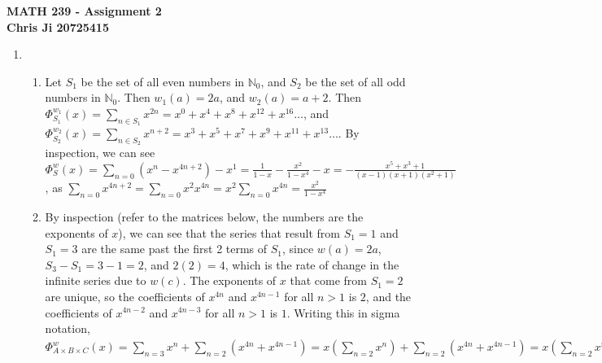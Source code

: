 \documentclass[10pt,english]{article}
\begin{document}
\noindent \begin{center}
\textbf{\large{}MATH 239 - Assignment 2}\\
\textbf{\large{}Chris Ji 20725415}
\par\end{center}{\large \par}
\medskip{}

\begin{enumerate}
\item \begin{enumerate}
    \item Let $S_1$ be the set of all even numbers in $\mathbb{N}_0$, and $S_2$ be the set of all odd numbers in $\mathbb{N}_0$. Then $w_1(a)=2a$, and $w_2(a)=a+2$. Then $\Phi_{S_1}^{w_1}(x)=\sum_{n\in S_1}x^{2n}=x^0+x^4+x^8+x^{12}+x^{16}\ldots$, and $\Phi_{S_2}^{w_2}(x)=\sum_{n\in S_2}x^{n+2}=x^3+x^5+x^7+x^9+x^{11}+x^{13}\ldots$. By inspection, we can see $\Phi_S^w(x)=\sum_{n=0}(x^n-x^{4n+2})-x^1=\frac{1}{1-x}-\frac{x^2}{1-x^4}-x=-\frac{x^5+x^3+1}{(x-1)(x+1)(x^2+1)}$, as $\sum_{n=0}x^{4n+2}=\sum_{n=0}x^2x^{4n}=x^2\sum_{n=0}x^{4n}=\frac{x^2}{1-x^4}$
    
    
    
    
    \item By inspection (refer to the matrices below, the numbers are the exponents of $x$), we can see that the series that result from $S_1=1$ and $S_1=3$ are the same past the first 2 terms of $S_1$, since $w(a)=2a$, $S_3-S_1=3-1=2$, and $2(2)=4$, which is the rate of change in the infinite series due to $w(c)$. The exponents of $x$ that come from $S_1=2$ are unique, so the coefficients of $x^{4n}$ and $x^{4n-1}$ for all $n>1$ is $2$, and the coefficients of $x^{4n-2}$ and $x^{4n-3}$ for all $n>1$ is $1$. Writing this in sigma notation, $\Phi_{A\times B\times C}^w(x)=\sum_{n=3}x^n+\sum_{n=2}(x^{4n}+x^{4n-1})=x\left(\sum_{n=2}x^n\right)+\sum_{n=2}(x^{4n}+x^{4n-1})=x\left(\sum_{n=2}x^n+x^{4n-1}+x^{4n-2}\right)=\frac{-x(x^4+x^2+1)}{x^2(x^2+1)(x-1)}$ \\ \\ \\ \\ \\ \\ 


\end{enumerate}
\end{enumerate}
\end{document}
